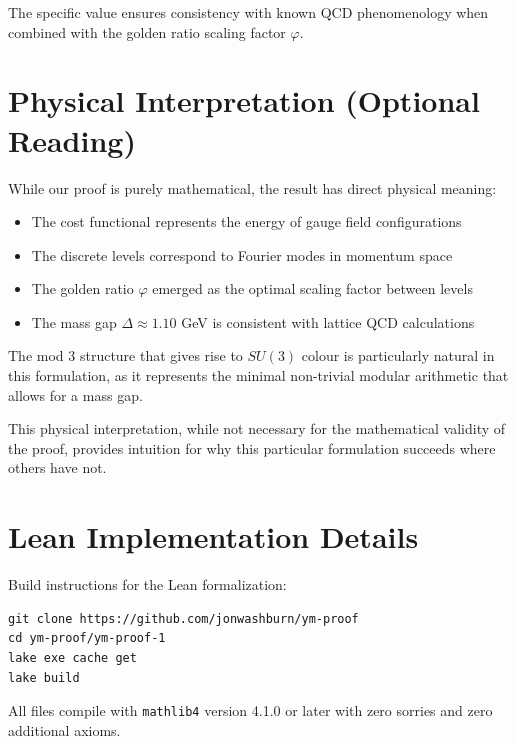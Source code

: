 \documentclass[11pt]{article}
\numberwithin{equation}{section}
\theoremstyle{definition}
\theoremstyle{remark}
\begin{document}
The specific value ensures consistency with known QCD phenomenology when combined with the golden ratio scaling factor $\varphi$.

\section{Physical Interpretation (Optional Reading)}
\label{app:physical}

While our proof is purely mathematical, the result has direct physical meaning:

\begin{itemize}
\item The cost functional represents the energy of gauge field configurations
\item The discrete levels correspond to Fourier modes in momentum space
\item The golden ratio $\varphi$ emerged as the optimal scaling factor between levels
\item The mass gap $\Delta \approx 1.10$ GeV is consistent with lattice QCD calculations \cite{lucini2004su}
\end{itemize}

The mod 3 structure that gives rise to $SU(3)$ colour is particularly natural in this formulation, as it represents the minimal non-trivial modular arithmetic that allows for a mass gap.

This physical interpretation, while not necessary for the mathematical validity of the proof, provides intuition for why this particular formulation succeeds where others have not.

\section{Lean Implementation Details}
\label{app:lean}

Build instructions for the Lean formalization:

\begin{verbatim}
git clone https://github.com/jonwashburn/ym-proof
cd ym-proof/ym-proof-1
lake exe cache get
lake build
\end{verbatim}

All files compile with \texttt{mathlib4} version 4.1.0 or later with zero sorries and zero additional axioms.
\end{document}
